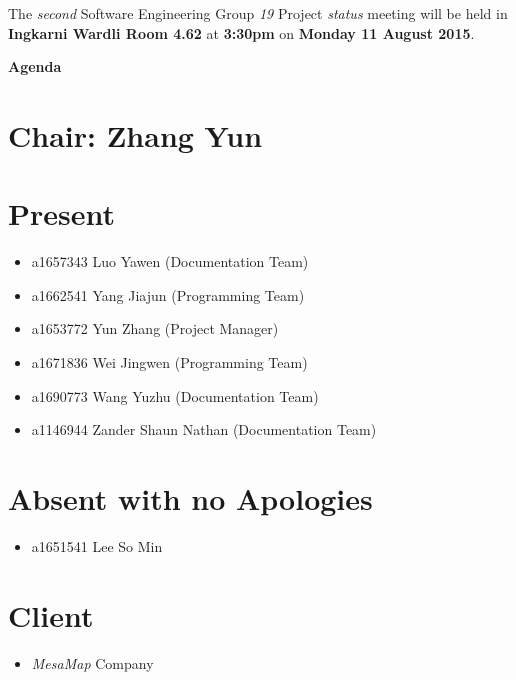 \documentclass[a4paper] {article}
\begin{document}
	
	\vspace*{-50pt}
	
	\noindent The \emph{second} Software Engineering Group \emph{19} Project \emph{status} meeting will
	be held in \textbf{Ingkarni Wardli Room 4.62} at \textbf {3:30pm} on \textbf{Monday 11 August 2015}.
	
	
	\begin{center}
		\huge \textbf {Agenda}
	\end{center}
	
	
	
	\section*{Chair: Zhang Yun}
	
	\vspace*{10pt}
	
	\section{Present}
	\begin{itemize}
		\item a1657343 Luo Yawen (Documentation Team)
		\item a1662541 Yang Jiajun (Programming Team)
		\item a1653772 Yun Zhang (Project Manager)
		\item a1671836 Wei Jingwen (Programming Team)
		\item a1690773 Wang Yuzhu (Documentation Team)
		\item a1146944 Zander Shaun Nathan (Documentation Team)
	\end{itemize}
	
	\section{Absent with no Apologies}
	\begin{itemize}
		\item a1651541 Lee So Min
	\end{itemize}  
	
        \section{Client}
        \begin{itemize}
            \item \emph{MesaMap} Company
        \end{itemize} 
	
\end{document}
